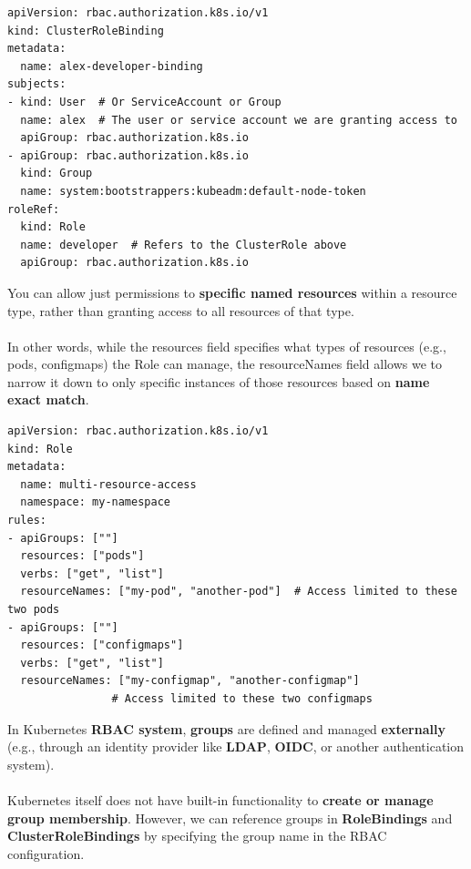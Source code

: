 \documentclass{article}
\newenvironment{blocktemplate}[1]{%
    \tcolorbox[beamer,%
    noparskip,breakable,
    colframe=Blue,%
    colbacklower=LimeGreen!75!LightGreen,%
    title=#1]}%
    {\endtcolorbox}
\newenvironment{blocktemplateI}[1]{%
    \tcolorbox[beamer,%
    noparskip,breakable,
    colframe=Violet,%
    colbacklower=Black,%
    title=#1]}%
    {\endtcolorbox}
\newenvironment{blocktemplateII}[1]{%
    \tcolorbox[beamer,%
    noparskip,breakable,
    colframe=Green,%
    colbacklower=LimeGreen!75!LightGreen,%
    title=#1]}%
    {\endtcolorbox}
\newenvironment{codetemplate}[1][]{%
  \mybasecolorbox[#1]
  \itshape
}{%
  \endmybasecolorbox
}
\begin{document}
\begin{blocktemplateII}{NOTE}
\begin{codetemplate}{}
\begin{verbatim}
apiVersion: rbac.authorization.k8s.io/v1
kind: ClusterRoleBinding
metadata:
  name: alex-developer-binding
subjects:
- kind: User  # Or ServiceAccount or Group
  name: alex  # The user or service account we are granting access to
  apiGroup: rbac.authorization.k8s.io
- apiGroup: rbac.authorization.k8s.io
  kind: Group
  name: system:bootstrappers:kubeadm:default-node-token
roleRef:
  kind: Role
  name: developer  # Refers to the ClusterRole above
  apiGroup: rbac.authorization.k8s.io
\end{verbatim}
\end{codetemplate}
\end{blocktemplateII}

\begin{blocktemplateI}{NOTE 2}
You can allow just permissions to \textbf{specific named resources} within a resource type, rather than granting access to all resources of that type.
\\\\
In other words, while the resources field specifies what types of resources (e.g., pods, configmaps) the Role can manage, the resourceNames field allows we to narrow it down to only specific instances of those resources based on \textbf{name exact match}.
\begin{codetemplate}{}
\begin{verbatim}
apiVersion: rbac.authorization.k8s.io/v1
kind: Role
metadata:
  name: multi-resource-access
  namespace: my-namespace
rules:
- apiGroups: [""]
  resources: ["pods"]
  verbs: ["get", "list"]
  resourceNames: ["my-pod", "another-pod"]  # Access limited to these two pods
- apiGroups: [""]
  resources: ["configmaps"]
  verbs: ["get", "list"]
  resourceNames: ["my-configmap", "another-configmap"]  
                # Access limited to these two configmaps
\end{verbatim}
\end{codetemplate}
\end{blocktemplateI}

\begin{blocktemplate}{NOTE 3}
In Kubernetes \textbf{RBAC system}, \textbf{groups} are defined and managed \textbf{externally} (e.g., through an identity provider like \textbf{LDAP}, \textbf{OIDC}, or another authentication system). 
\\\\
Kubernetes itself does not have built-in functionality to \textbf{create or manage group membership}. However, we can reference groups in \textbf{RoleBindings} and \textbf{ClusterRoleBindings} by specifying the group name in the RBAC configuration.
\end{blocktemplate}
\end{document}
